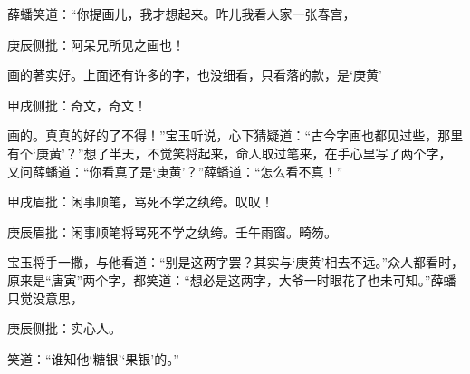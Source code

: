 \begin{parag}


    薛蟠笑道：“你提画儿，我才想起来。昨儿我看人家一张春宫，\begin{note}庚辰侧批：阿呆兄所见之画也！\end{note}画的著实好。上面还有许多的字，也没细看，只看落的款，是‘庚黄’\begin{note}甲戌侧批：奇文，奇文！\end{note}画的。真真的好的了不得！”宝玉听说，心下猜疑道：“古今字画也都见过些，那里有个‘庚黄’？”想了半天，不觉笑将起来，命人取过笔来，在手心里写了两个字，又问薛蟠道：“你看真了是‘庚黄’？”薛蟠道：“怎么看不真！”\begin{note}甲戌眉批：闲事顺笔，骂死不学之纨绔。叹叹！\end{note}\begin{note}庚辰眉批：闲事顺笔将骂死不学之纨绔。壬午雨窗。畸笏。\end{note}宝玉将手一撒，与他看道：“别是这两字罢？其实与‘庚黄’相去不远。”众人都看时，原来是“唐寅”两个字，都笑道：“想必是这两字，大爷一时眼花了也未可知。”薛蟠只觉没意思，\begin{note}庚辰侧批：实心人。\end{note}笑道：“谁知他‘糖银’‘果银’的。”
\end{parag}



